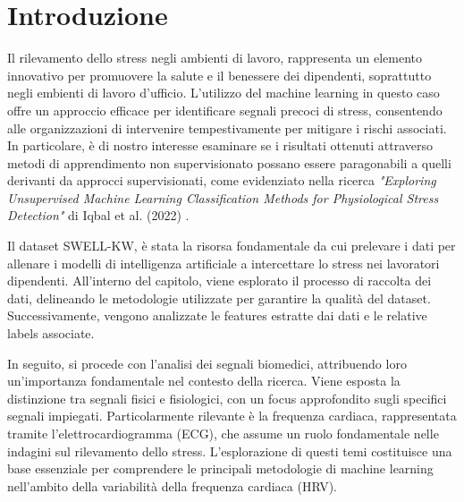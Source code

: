 \pagestyle{fancy}

\fancyhf{}

\fancyfoot[C]{\thepage}


\chapter{Introduzione}

\large

Il rilevamento dello stress negli ambienti di lavoro, rappresenta un elemento innovativo per promuovere la salute e il benessere dei dipendenti, soprattutto negli embienti di lavoro d'ufficio. L'utilizzo del machine learning in questo caso offre un approccio efficace per identificare segnali precoci di stress, consentendo alle organizzazioni di intervenire tempestivamente per mitigare i rischi associati. In particolare, è di nostro interesse esaminare se i risultati ottenuti attraverso metodi di apprendimento non supervisionato possano essere paragonabili a quelli derivanti da approcci supervisionati, come evidenziato nella ricerca \textit{"Exploring Unsupervised Machine Learning Classification Methods for Physiological Stress Detection"} di Iqbal et al. (2022) \cite{iqbal2022exploring}.

\bigskip

Il dataset SWELL-KW, è stata la risorsa fondamentale da cui prelevare i dati per allenare i modelli di intelligenza artificiale a intercettare lo stress nei lavoratori dipendenti. All'interno del capitolo, viene esplorato il processo di raccolta dei dati, delineando le metodologie utilizzate per garantire la qualità del dataset. Successivamente, vengono analizzate le features estratte dai dati e le relative labels associate.

\bigskip

In seguito, si procede con l'analisi dei segnali biomedici, attribuendo loro un'importanza fondamentale nel contesto della ricerca. Viene esposta la distinzione tra segnali fisici e fisiologici, con un focus approfondito sugli specifici segnali impiegati. Particolarmente rilevante è la frequenza cardiaca, rappresentata tramite l'elettrocardiogramma (ECG), che assume un ruolo fondamentale nelle indagini sul rilevamento dello stress. L'esplorazione di questi temi costituisce una base essenziale per comprendere le principali metodologie di machine learning nell'ambito della variabilità della frequenza cardiaca (HRV).

